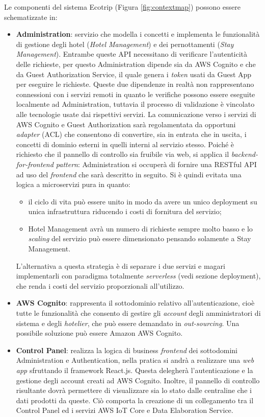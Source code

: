 Le componenti del sistema Ecotrip (Figura \ref{fig:contextmap}) possono essere schematizzate in:
\begin{itemize}
    \item \textbf{Administration}: servizio che modella  i concetti e implementa le funzionalità di gestione degli hotel (\textit{Hotel Management}) e dei pernottamenti (\textit{Stay Management}).  Entrambe queste API necessitano di verificare l'autenticità delle richieste, per questo Administration dipende sia da AWS Cognito e che da Guest Authorization Service, il quale genera i \textit{token} usati da Guest App per eseguire le richieste. Queste due dipendenze in realtà non rappresentano connessioni con i servizi remoti in quanto le verifiche possono essere eseguite localmente ad Administration, tuttavia il processo di validazione è vincolato alle tecnologie usate dai rispettivi servizi. La comunicazione verso i servizi di AWS Cognito e Guest Authorization sarà regolamentata da opportuni \textit{adapter} (ACL) che consentono di convertire, sia in entrata che in uscita, i concetti di dominio esterni in quelli interni al servizio stesso.  
    Poiché è richiesto che il pannello di controllo sia fruibile via web, si applica il \textit{backend-for-frontend pattern}: Administration si occuperà di fornire una RESTful API ad uso del \textit{frontend} che sarà descritto in seguito.
    Si è quindi evitata una logica a microservizi pura in quanto:
    \begin{itemize}
        \item il ciclo di vita può essere unito in modo da avere un unico deployment su unica infrastruttura riducendo i costi di fornitura del servizio;
        \item Hotel Management avrà un numero di richieste sempre molto basso e lo \textit{scaling} del servizio può essere dimensionato pensando solamente a Stay Management.
    \end{itemize}
    L'alternativa a questa strategia è di separare i due servizi e magari implementarli con paradigma totalmente \textit{serverless} (vedi sezione deployment), che renda i costi del servizio proporzionali all'utilizzo.
    \item \textbf{AWS Cognito}: rappresenta il sottodominio relativo all'autenticazione, cioè tutte le funzionalità che consento di gestire gli \textit{account} degli amministratori di sistema e degli \textit{hotelier}, che può essere demandato in \textit{out-sourcing}. Una possibile soluzione può essere Amazon AWS Cognito.
    \item \textbf{Control Panel}: realizza la logica di business \textit{frontend} dei sottodomini Administration e Authentication, nella pratica si andrà a realizzare una \textit{web app} sfruttando il framework React.js. Questa delegherà l'autenticazione e la gestione degli account creati ad AWS Cognito. Inoltre, il pannello di controllo risultante dovrà permettere di visualizzare sia lo stato dalle centraline che i dati prodotti da queste. Ciò comporta la creazione di un collegamento tra il Control Panel ed i servizi AWS IoT Core e Data Elaboration Service.

\end{itemize}
